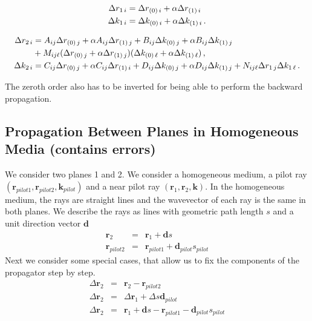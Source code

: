 \documentclass[12pt,a4paper,twoside,openright,BCOR10mm,headsepline,titlepage,abstracton,chapterprefix,final]{scrreprt}
\newcommand\Vector[1]{{\mathbf{#1}}}
\newcommand\wavenumber{k}
\newcommand\Wavevector{\Vector{\wavenumber}}
\begin{document}
\begin{eqnarray}
 \Delta {r}_{1\,i} & = \Delta {r}_{(0)\,i} + \alpha \Delta {r}_{(1)\,i}\\
 \Delta {k}_{1\,i} & = \Delta {k}_{(0)\,i} + \alpha \Delta {k}_{(1)\,i}\,.
\end{eqnarray}

\begin{eqnarray}
 \Delta {r}_{2\,i} & = A_{ij} \Delta {r}_{(0)\,j} + \alpha A_{ij} \Delta {r}_{(1)\,j} + B_{ij} \Delta {k}_{(0)\,j} + \alpha B_{ij}\Delta {k}_{(1)\,j}\nonumber\\
  & + M_{ij\ell} (\Delta {r}_{(0)\,j} + \alpha \Delta {r}_{(1)\,j}) (\Delta {k}_{(0)\,\ell} + \alpha \Delta {k}_{(1)\,\ell})\,,\\
 \Delta {k}_{2\,i} & = C_{ij} \Delta {r}_{(0)\,j} + \alpha C_{ij} \Delta {r}_{(1)\,i} + D_{ij} \Delta {k}_{(0)\,j} + \alpha D_{ij}\Delta {k}_{(1)\,j} + N_{ij\ell} \Delta {r}_{1\,j} \Delta {k}_{1\,\ell}\,.
\end{eqnarray}

The zeroth order also has to be inverted for being able to perform the backward propagation.


\subsection{Propagation Between Planes in Homogeneous Media (contains errors)}
We consider two planes 1 and 2.
We consider a homogeneous medium, a pilot ray $( \Vector{r}_{pilot1}, \Vector{r}_{pilot2}, \Wavevector_{pilot} )$
and a near pilot ray $( \Vector{r}_{1}, \Vector{r}_{2}, \Wavevector )$. 
In the homogeneous medium, the rays are straight lines and the wavevector of each ray is the same in both planes.
We describe the rays as lines with geometric path length $s$ and a unit direction vector $\Vector{d}$
\begin{eqnarray}
 \Vector{r}_{2} &=& \Vector{r}_{1} + \Vector{d} s  \\
 \Vector{r}_{pilot2} &=& \Vector{r}_{pilot1} + \Vector{d}_{pilot} s_{pilot}
\end{eqnarray}
Next we consider some special cases, that allow us to fix the components of the propagator step by step.
\begin{eqnarray}
 \Delta \Vector{r}_2 &=& \Vector{r}_{2} - \Vector{r}_{pilot2} \\
 \Delta \Vector{r}_2 &=& \Delta \Vector{r}_1 + \Delta s \Vector{d}_{pilot} \\
 \Delta \Vector{r}_2 &=& \Vector{r}_{1} + \Vector{d} s  - \Vector{r}_{pilot1} - \Vector{d}_{pilot} s_{pilot}
\end{eqnarray}
\end{document}
